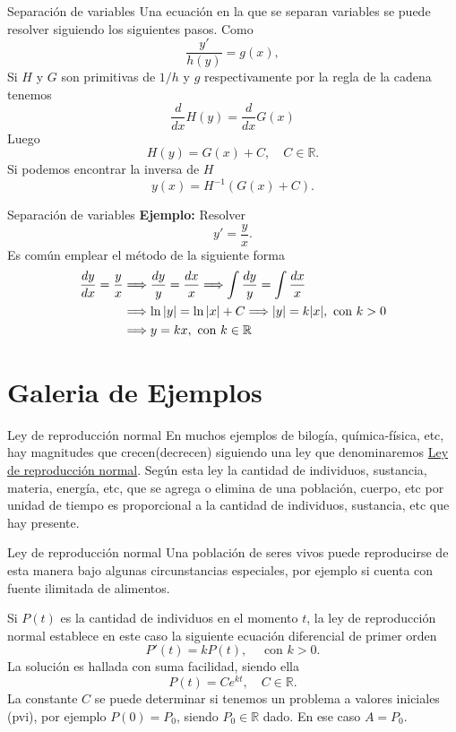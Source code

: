 \documentclass[handout,hyperref={colorlinks=true}]{beamer}
\newcommand{\rr}{\mathbb{R}}
\newcommand{\nl}{\onslide<+-> }
\begin{document}
\begin{frame}{Separación de variables} 
Una ecuación  en la que se separan variables se puede resolver siguiendo los siguientes pasos. Como
\[\frac{y'}{h(y)}=g(x),\]
Si $H$ y $G$ son primitivas de $1/h$ y $g$ respectivamente por la regla de la cadena tenemos
\[\frac{d}{dx}H(y)=\frac{d}{dx}G(x)\]
Luego 
\[H(y)=G(x)+C,\quad C\in\rr.\]
Si podemos encontrar la inversa de $H$
\[y(x)=H^{-1}\left(G(x)+C\right).\]


\end{frame}

\begin{frame}{Separación de variables} 
\textbf{Ejemplo:} Resolver
\[y'=\frac{y}{x}.\]
Es común emplear el método de la siguiente forma
\[\begin{split}
   \frac{dy}{dx}=\frac{y}{x} &\Longrightarrow \frac{dy}{y}=\frac{dx}{x} \Longrightarrow \int \frac{dy}{y}=\int \frac{dx}{x}\\
   &\Longrightarrow\ln|y|=\ln|x|+C \Longrightarrow |y|= k|x|, \hbox{ con }k>0\\
   &\Longrightarrow y= kx, \hbox{ con }k\in\rr
  \end{split}
\]

\end{frame}

\section{Galeria de Ejemplos}

\begin{frame}{Ley de reproducción normal}
\nl  En muchos ejemplos de bilogía, química-física, etc, hay magnitudes que crecen(decrecen) siguiendo una ley que denominaremos 
\href{http://es.wikipedia.org/wiki/Crecimiento_exponencial}{Ley de reproducción  normal}. Según esta ley la cantidad de individuos, sustancia, materia,
energía, etc, que se agrega o elimina de una población, cuerpo, etc por unidad de tiempo es proporcional a la cantidad de individuos, sustancia, etc que hay presente.

\end{frame}

\begin{frame}{Ley de reproducción normal}
\nl  Una población de seres vivos puede reproducirse de esta manera bajo algunas circunstancias 
especiales, por ejemplo si cuenta con fuente ilimitada de alimentos.

\nl  Si $P(t)$ es la cantidad de individuos en el momento $t$, la ley de reproducción normal establece
en este caso la siguiente ecuación diferencial de primer orden
\[P'(t)=kP(t),\quad\text{ con } k>0.\]
La solución es hallada con suma facilidad, siendo ella 
\[\boxed{P(t)=Ce^{kt},\quad C\in\rr.}\]
La constante  $C$ se puede determinar si tenemos un problema a valores iniciales (pvi), por ejemplo $P(0)=P_0$, siendo $P_0\in\rr$ dado. En ese caso
$A=P_0$. 
\end{frame}
\end{document}
